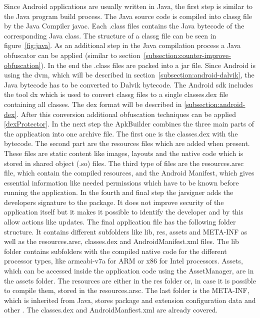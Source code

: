 Since Android applications are usually written in Java, the first step is similar to the Java program build process.
The Java source code is compiled into \gls{classg} file by the Java Compiler javac.
Each .class files contains the Java bytecode of the corresponding Java class.
The structure of a \gls{classg} file can be seen in figure~\ref{fig:java}.
As an additional step in the Java compilation process a Java obfuscator can be applied (similar to section~\ref{subsection:counter-improve-obfuscation}).
In the end the .class files are packed into a \gls{jar} file.
\newline
Since Android is using the \gls{dvm}, which will be described in section~\ref{subsection:android-dalvik}, the Java bytecode has to be converted to Dalvik bytecode.
The Android \gls{sdk} includes the tool dx which is used to convert \gls{classg} files to a single classes.dex file containing all classes.
The \gls{dex} format will be described in \ref{subsection:android-dex}.
After this conversion additional obfuscation techniques can be applied \ref{dexProtector}.
\newline
In the next step the ApkBuilder combines the three main parts of the application into one archive file.
The first one is the classes.dex with the bytecode.
The second part are the resources files which are added when present.
These files are static content like images, layouts and the native code which is stored in shared object (.so) files.
The third type of files are the resources.arsc file, which contain the compiled resources, and the Android Manifest, which gives essential information like needed permissions which have to be known before running the application.
\newline
In the fourth and final step the jarsigner adds the developers signature to the package.
It does not improve security of the application itself but it makes it possible to identify the developer and by this allow actions like updates.
\newline
\newline
The final application file has the following folder structure.
It contains different subfolders like lib, res, assets and META-INF as well as the resources.arsc, classes.dex and AndroidManifest.xml files.
The lib folder contains subfolders with the compiled native code for the different processor types, like armeabi-v7a for ARM or x86 for Intel processors.
Assets, which can be accessed inside the application code using the AssetManager, are in the assets folder.
The resources are either in the res folder or, in case it is possible to compile them, stored in the resources.arsc.
The last folder is the META-INF, which is inherited from Java, stores package and extension configuration data and other \cite{metaJava}.
The classes.dex and AndroidManfiest.xml are already covered.
\cite{kovachevaMaster} \cite{ehringerDalvik}
